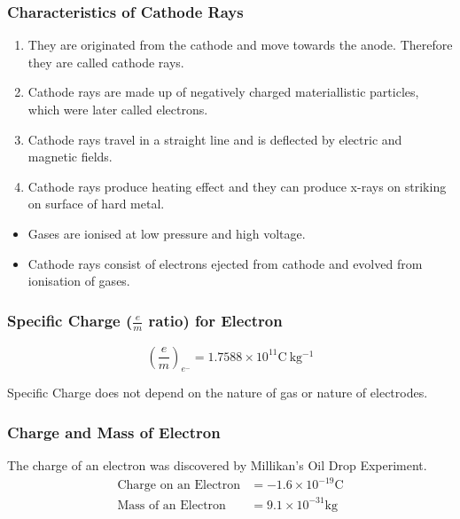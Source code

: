 \documentclass[12pt,a4paper]{article}
\begin{document}
\subsubsection*{Characteristics of Cathode Rays}
\begin{enumerate}
  \item They are originated from the cathode and move towards the anode. Therefore they are called cathode rays.
  \item Cathode rays are made up of negatively charged materiallistic particles, which were later called electrons.
  \item Cathode rays travel in a straight line and is deflected by electric and magnetic fields.
  \item Cathode rays produce heating effect and they can produce x-rays on striking on surface of hard metal.
\end{enumerate}

\begin{note}
  \begin{itemize}
    \item Gases are ionised at low pressure and high voltage.
    \item Cathode rays consist of electrons ejected from cathode and evolved from ionisation of gases.
  \end{itemize}
\end{note}

\subsubsection*{Specific Charge ($\frac em$ ratio) for Electron}

$$\left(\frac em\right)_{e^-}=1.7588\times 10^{11} \mathrm{C\ kg^{-1}}$$

Specific Charge does not depend on the nature of gas or nature of electrodes.

\subsubsection*{Charge and Mass of Electron}

The charge of an electron was discovered by Millikan's Oil Drop Experiment.
\begin{align*}
  \text{Charge on an Electron} & = -1.6\times 10^{-19} \mathrm{C} \\
  \text{Mass of an Electron}   & = 9.1\times 10^{-31} \mathrm{kg}
\end{align*}
\end{document}
